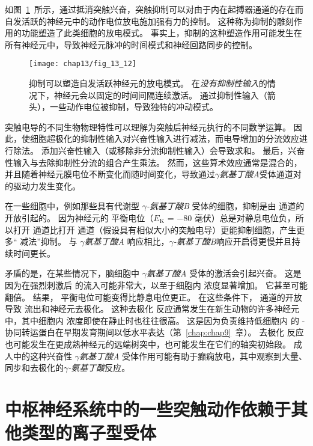 如图~\ref{fig:13_12}~所示，通过抵消突触兴奋，突触抑制可以对由于内在起搏器通道的存在而自发活跃的神经元中的动作电位放电施加强有力的控制。
这种称为抑制的雕刻作用的功能塑造了此类细胞的放电模式。
事实上，抑制的这种塑造作用可能发生在所有神经元中，导致神经元脉冲的时间模式和神经回路同步的控制。


\begin{figure}[htbp]
	\centering
	\texttt{[image: chap13/fig\_13\_12]}
	\caption{抑制可以塑造自发活跃神经元的放电模式。
		在\textit{没有抑制性输入}的情况下，神经元会以固定的时间间隔连续激活。
		通过抑制性输入（箭头），一些动作电位被抑制，导致独特的冲动模式。}
	\label{fig:13_12}
\end{figure}


突触电导的不同生物物理特性可以理解为突触后神经元执行的不同数学运算。
因此，使细胞超极化的抑制性输入对兴奋性输入进行减法，而电导增加的分流效应进行除法。
添加兴奋性输入（或移除非分流抑制性输入）会导致求和。
最后，兴奋性输入与去除抑制性分流的组合产生乘法。
然而，这些算术效应通常是混合的，并且随着神经元膜电位不断变化而随时间变化，导致通过\textit{$\gamma$氨基丁酸A}受体通道对  的驱动力发生变化。


在一些细胞中，例如那些具有代谢型 \textit{$\gamma$-氨基丁酸B} 受体的细胞，抑制是由  通道的开放引起的。
因为神经元的  平衡电位（$E_\text{K}$ = −80 毫伏）总是对静息电位负，所以打开  通道比打开  通道（假设具有相似大小的突触电导）更能抑制细胞，产生更多“ 减法”抑制。
与 \textit{$\gamma$氨基丁酸A} 响应相比，\textit{$\gamma$-氨基丁酸B}响应开启得更慢并且持续时间更长。


矛盾的是，在某些情况下，脑细胞中 \textit{$\gamma$氨基丁酸A} 受体的激活会引起兴奋。
这是因为在强烈刺激后  的流入可能非常大，以至于细胞内  浓度显著增加。
它甚至可能翻倍。
结果， 平衡电位可能变得比静息电位更正。
在这些条件下， 通道的开放导致  流出和神经元去极化。
这种去极化  反应通常发生在新生动物的许多神经元中，其中细胞内  浓度即使在静止时也往往很高。
这是因为负责维持低细胞内  的 - 协同转运蛋白在早期发育期间以低水平表达（第~\ref{chap:chap9}~章）。
去极化  反应也可能发生在更成熟神经元的远端树突中，也可能发生在它们的轴突初始段。
成人中的这种兴奋性 \textit{$\gamma$氨基丁酸A} 受体作用可能有助于癫痫放电，其中观察到大量、同步和去极化的\textit{$\gamma$-氨基丁酸}反应。



\section{中枢神经系统中的一些突触动作依赖于其他类型的离子型受体}

